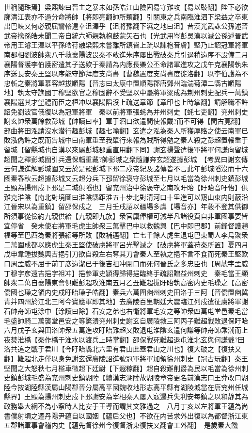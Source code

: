 世稱隨珠焉】梁熙諫曰晉主之暴未如孫皓江山險固易守難攻【易以䜴翻】陛下必欲廓清江表亦不過分命將帥【將即亮翻帥所類翻】引關東之兵南臨淮泗下梁益之卒東出巴峽又何必親屈鸞輅遠幸沮澤乎【沮將豫翻下濕之地曰沮】昔漢光武誅公孫述晉武帝擒孫皓未聞二帝自統六師親執枹鼓蒙矢石也【光武用岑彭吳漢以滅公孫述晉武帝用王濬王渾以平孫皓苻融梁熙未嘗離所鎮皆上疏以諫枹音膚】堅乃止詔冠軍將軍南郡相劉波帥衆八千救襄陽波畏秦不敢進朱序屢出戰破秦兵引退稍遠序不設備二月襄陽督護李伯護密遣其子送欵于秦請為内應長樂公丕命諸軍進攻之戊午克襄陽執朱序送長安秦王堅以序能守節拜度支尚書【曹魏置度支尚書度徙洛翻】以李伯護為不忠斬之秦將軍慕容越拔順陽【晉志曰太康中置順陽郡唐鄧州臨湍菊潭二縣古順陽地】執太守譙國丁穆堅欲官之穆固辭不受堅以中壘將軍梁成為荆州刺史配兵一萬鎮襄陽選其才望禮而臣之桓冲以襄陽䧟沒上疏送章節【章印也上時掌翻】請解職不許詔免劉波官俄復以為冠軍將軍　秦以前將軍張蚝為并州刺史【蚝七吏翻】兖州刺史謝玄帥衆萬餘救彭城【帥讀曰率】軍于泗口欲遣間使報戴?而不可得【間古莧翻】部曲將田泓請沒水潜行趣彭城【趣七喻翻】玄遣之泓為秦人所獲厚賂之使云南軍已敗泓偽許之既而告城中曰南軍垂至我單行來報為賊所得勉之秦人殺之彭超置輜重于留城【留縣城也自漢以來屬彭城郡重直用翻下同】謝玄揚聲遣後軍將軍何謙向留城超聞之釋彭城圍引兵還保輜重戴?帥彭城之衆隨謙奔玄超遂據彭城　【考異曰謝玄傳云何謙進解彭城圍又云於是罷彭城下邳二戍帝紀及諸傳皆不言此年彭城䧟沒而十六國秦春秋云超據彭城又云超分兵下邳留徐褒守彭城至七月以毛當為徐州刺史鎮彭城王顯為揚州戍下邳是二城俱䧟也】留兖州治中徐褒守之南攻盱眙【盱眙音吁怡】俱難克淮陰【南北對境圖曰淮陰縣距淮五十步北對清河口十里進可以窺山東内則蔽沿江晉宋以為重鎮】留邵保戍之　三月壬戌詔以疆場多虞【場音亦】年穀不登其供御所須事從儉約九親供給【九親即九族】衆官廩俸權可減半凡諸役費自非軍國事要皆宜停省　癸未使右將軍毛虎生帥衆三萬擊巴中以救魏興【巴中即巴郡】前鋒督護趙福等至巴西為秦將張紹等所敗【敗補邁翻】亡七千餘人虎生退屯巴東蜀人李烏聚衆二萬圍成都以應虎生秦王堅使破虜將軍呂光擊滅之【破虜將軍蓋苻秦所置】夏四月戊申韋鍾拔魏興吉挹引刀欲自殺左右奪其刀會秦人至執之挹不言不食而死秦王堅歎曰周孟威不屈于前丁彦遠潔已于後吉祖冲閉口而死何晉氏之多忠臣也【周虓字孟威丁穆字彦遠吉挹字祖冲】挹參軍史頴得歸得挹臨終手疏詔贈益州刺史　秦毛當王顯帥衆二萬自襄陽東會俱難彭超攻淮南五月乙丑難超拔盱眙執高密内史毛璪之【高密僑國也璪之領内史戍盱眙璪子皓翻】秦兵六萬圍幽州刺史田洛于三阿【晉僑置幽冀青并四州於江北三阿今寶應軍即其地】去廣陵百里朝廷大震臨江列戍遣征虜將軍謝石帥舟師屯涂中【涂讀曰除】石安之弟也右衛將軍毛安之等帥衆四萬屯堂邑秦毛當毛盛帥騎二萬襲堂邑安之等驚潰兖州刺史謝玄自廣陵救三阿丙子難超戰敗退保盱眙六月戊子玄與田洛帥衆五萬進攻盱眙難超又敗退屯淮陰玄遣何謙等帥舟師乘潮而上夜焚淮橋【秦作橋于淮水以渡兵上時掌翻】邵保戰死難超退屯淮北玄與何謙戴?田洛共追之戰于君川【今盱眙縣北六里有君山此蓋君山之川也】復大破之【復扶又翻】難超北走僅以身免謝玄還廣陵詔進號冠軍將軍加領徐州刺史【冠古玩翻】秦王堅聞之大怒秋七月檻車徵超下廷尉【下遐稼翻】超自殺難削爵為民以毛當為徐州刺史鎮彭城毛盛為兖州刺史鎮湖陸【續漢志湖陸故湖陵章帝更名前漢志曰王莽改曰湖陸今按湖陸縣漢屬山陽郡晉分屬高平國魏收地形志高平縣有湖陵城當在唐兖州任城縣界】王顯為揚州刺史戍下邳謝安為宰相秦人屢入寇邊兵失利安每鎮之以和静其為政務舉大綱不為小察時人比安于王導而謂其文雅過之　八月丁亥以左將軍王藴為尚書僕射頃之遷丹陽尹藴自以國姻【藴后父也】不欲在内苦求外出復以為都督浙江東五郡諸軍事會稽内史【藴先督徐州今復督浙東復扶又翻會工外翻】　是歲秦大饑

